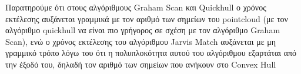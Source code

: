 \documentclass{article}
\begin{document}
\noindent
Παρατηρούμε ότι στους αλγόριθμους Graham Scan και Quickhull ο χρόνος εκτέλεσης αυξάνεται γραμμικά με τον αριθμό
των σημείων του pointcloud (με τον αλγόριθμο quickhull να είναι πιο γρήγορος σε σχέση με τον αλγόριθμο
Graham Scan), ενώ ο χρόνος εκτέλεσης του αλγόριθμου Jarvis Match αυξάνεται με μη γραμμικό τρόπο λόγω του ότι
η πολυπλοκότητα αυτού του αλγόριθμου εξαρτάται από την έξοδό του, δηλαδή τον αριθμό των σημείων που ανήκουν
στο Convex Hull
\end{document}
